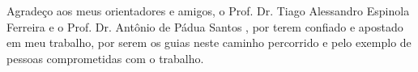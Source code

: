 \begin{agradecimentos}
Agradeço aos meus orientadores e amigos, o Prof. Dr. Tiago Alessandro Espinola Ferreira e o Prof. Dr. Antônio de Pádua Santos , por terem confiado e apostado em meu trabalho, por serem os guias neste caminho percorrido e pelo exemplo de pessoas comprometidas com o trabalho.
\end{agradecimentos}